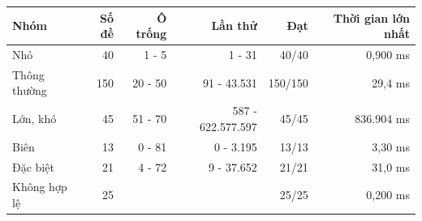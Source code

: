 \begin{tabular}{@{}lrrrrr@{}}
\toprule
\textbf{Nhóm} & \textbf{Số đề} & \textbf{Ô trống} & \textbf{Lần thử} & \textbf{Đạt} & \textbf{Thời gian lớn nhất} \\
\midrule
Nhỏ & 40 & 1 - 5 & 1 - 31 & 40/40 & 0,900 ms \\
Thông thường & 150 & 20 - 50 & 91 - 43.531 & 150/150 & 29,4 ms \\
Lớn, khó & 45 & 51 - 70 & 587 - 622.577.597 & 45/45 & 836.904 ms \\
Biên & 13 & 0 - 81 & 0 - 3.195 & 13/13 & 3,30 ms \\
Đặc biệt & 21 & 4 - 72 & 9 - 37.652 & 21/21 & 31,0 ms \\
Không hợp lệ & 25 &  &  & 25/25 & 0,200 ms \\
\bottomrule
\end{tabular}
